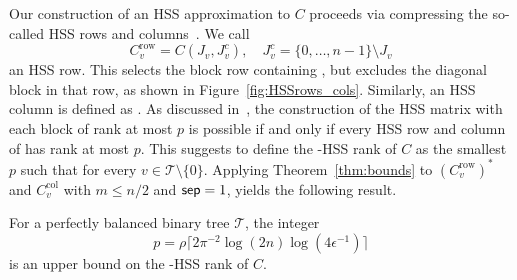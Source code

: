Our construction of an HSS approximation to $C$ proceeds via compressing the so-called HSS rows and columns~\cite{benzi2016matrices, martinsson2011fast,xia2010fast}.
We call
\[
 C_v^{\mathrm{row}} = C(J_v, J_v^c), \quad J_v^c = \{ 0, \ldots, n-1\} \setminus J_v
\]
an HSS row. This selects the block row containing , but excludes the diagonal block in that row, as shown in Figure~\ref{fig:HSSrows_cols}.
Similarly, an HSS column is defined as .  
As discussed in~\cite{xia2010fast}, the construction of the HSS matrix  with each block  of rank at most $p$ is possible if and only if every HSS row and column of  has rank at most $p$. 
This suggests to define the -HSS rank of $C$  as the smallest $p$ such that  for every $v \in \mathcal{T} \setminus \{0\}$. Applying Theorem~\ref{thm:bounds}
to $( C^{\mathrm{row}}_v )^*$ and
$C^{\mathrm{col}}_v$ with $m \le n/2$ and $\mathsf{sep} = 1$, 
yields the following result.
\begin{lemma} 
\label{lemma:HSS_rank}
For a perfectly balanced binary
tree $\mathcal{T}$, the integer
\[
p = \rho \big\lceil 2\pi^{-2} \log (2n) \log(4 \epsilon^{-1} ) \big\rceil
\]
 is an upper bound on the -HSS rank of $C$.
\end{lemma}

